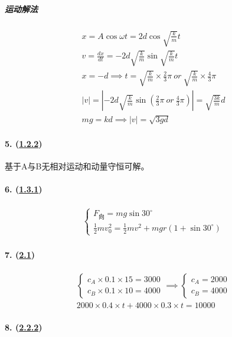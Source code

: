 \subparagraph{运动解法}

\begin{gather*}
    x=A\cos\omega t=2d\cos\sqrt{\frac{k}{m}}t\\
    v=\frac{dx}{dt}=-2d\sqrt{\frac{k}{m}}\sin\sqrt{\frac{k}{m}}t\\
    x=-d\implies t=\sqrt{\frac{k}{m}}\times\frac23\pi\ or\ \sqrt{\frac{k}{m}}\times\frac43\pi\\
    |v|=\left|-2d\sqrt{\frac{k}{m}}\sin\left(\frac23\pi\ or\ \frac43\pi\right)\right|=\sqrt{\frac{3k}{m}}d\\
    mg=kd\implies|v|=\sqrt{3gd}
\end{gather*}

\paragraph{5. (\hyperref[subsec:1.2.2]{1.2.2})} 基于A与B无相对运动和动量守恒可解。
\paragraph{6. (\hyperref[subsec:1.3.1]{1.3.1})}

\begin{gather*}
    \begin{cases}
        F_\textrm{向}=mg\sin30^\circ\\
        \frac12mv_0^2=\frac12mv^2+mgr(1+\sin30^\circ)
    \end{cases}
\end{gather*}

\paragraph{7. (\hyperref[sec:2.1]{2.1})}

\begin{gather*}
    \begin{cases}
        c_A\times0.1\times15=3000\\
        c_B\times0.1\times10=4000
    \end{cases}\implies
    \begin{cases}
        c_A=2000\\
        c_B=4000
    \end{cases}\\
    2000\times0.4\times t+4000\times0.3\times t=10000
\end{gather*}

\paragraph{8. (\hyperref[subsec:2.2.2]{2.2.2})}

